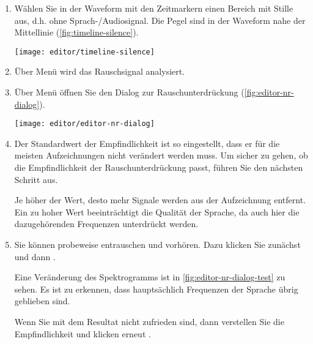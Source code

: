 \begin{enumerate}
	\item Wählen Sie in der Waveform mit den Zeitmarkern einen Bereich mit Stille aus, d.h. ohne Sprach-/Audiosignal. Die Pegel sind in der Waveform nahe der Mittellinie (\autoref{fig:timeline-silence}).
	
	\begin{minipage}{0.9\textwidth}
		\centering
		\captionsetup{type=figure}
		\texttt{[image: editor/timeline-silence]}
		\label{fig:timeline-silence}
	\end{minipage}

	\item Über Menü  wird das Rauschsignal analysiert.
	\item Über Menü  öffnen Sie den Dialog zur Rauschunterdrückung (\autoref{fig:editor-nr-dialog}).

	\begin{minipage}{0.9\textwidth}
		\centering
		\captionsetup{type=figure}
		\texttt{[image: editor/editor-nr-dialog]}
		\label{fig:editor-nr-dialog}
	\end{minipage}

	\item Der Standardwert der Empfindlichkeit ist so eingestellt, dass er für die meisten Aufzeichnungen nicht verändert werden muss. Um sicher zu gehen, ob die Empfindlichkeit der Rauschunterdrückung passt, führen Sie den nächsten Schritt aus.
	
	\begin{info}
		Je höher der Wert, desto mehr Signale werden aus der Aufzeichnung entfernt. Ein zu hoher Wert beeinträchtigt die Qualität der Sprache, da auch hier die dazugehörenden Frequenzen unterdrückt werden.
	\end{info}

	\item Sie können probeweise entrauschen und vorhören. Dazu klicken Sie zunächst  und dann \editorplay{}.
	
	Eine Veränderung des Spektrogramms ist in \autoref{fig:editor-nr-dialog-test} zu sehen. Es ist zu erkennen, dass hauptsächlich Frequenzen der Sprache übrig geblieben sind.
	
	Wenn Sie mit dem Resultat nicht zufrieden sind, dann verstellen Sie die Empfindlichkeit und klicken erneut .


\end{enumerate}
